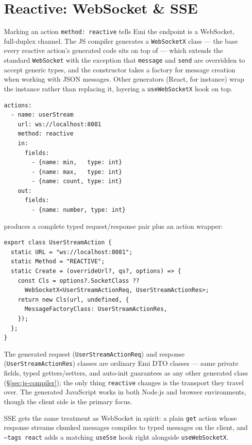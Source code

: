 \section{Reactive: WebSocket \& SSE}
\label{sec:reactive}

Marking an action \texttt{method: reactive} tells Emi the endpoint is a
WebSocket, full-duplex channel. The JS compiler generates a
\texttt{WebSocketX} class --- the base every reactive action's generated
code sits on top of --- which extends the standard \texttt{WebSocket}
with the exception that \texttt{message} and \texttt{send} are overridden
to accept generic types, and the constructor takes a factory for message
creation when working with JSON messages. Other generators (React, for
instance) wrap the instance rather than replacing it, layering a
\texttt{useWebSocketX} hook on top.

\begin{lstlisting}
actions:
  - name: userStream
    url: ws://localhost:8081
    method: reactive
    in:
      fields:
        - {name: min,   type: int}
        - {name: max,   type: int}
        - {name: count, type: int}
    out:
      fields:
        - {name: number, type: int}
\end{lstlisting}

produces a complete typed request/response pair plus an action wrapper:

\begin{lstlisting}
export class UserStreamAction {
  static URL = "ws://localhost:8081";
  static Method = "REACTIVE";
  static Create = (overrideUrl?, qs?, options) => {
    const Cls = options?.SocketClass ??
      WebSocketX<UserStreamActionReq, UserStreamActionRes>;
    return new Cls(url, undefined, {
      MessageFactoryClass: UserStreamActionRes,
    });
  };
}
\end{lstlisting}

The generated request (\texttt{UserStreamActionReq}) and response
(\texttt{UserStreamActionRes}) classes are ordinary Emi DTO classes ---
same private fields, typed getters/setters, and auto-init guarantees as
any other generated class (\S\ref{sec:js-compiler}); the only thing
\texttt{reactive} changes is the transport they travel over. The
generated JavaScript works in both Node.js and browser environments,
though the client side is the primary focus.

\begin{pullquote}
SSE gets the same treatment as WebSocket in spirit: a plain \texttt{get}
action whose response streams chunked messages compiles to typed
messages on the client, and \texttt{--tags react} adds a matching
\texttt{useSse} hook right alongside \texttt{useWebSocketX}.
\end{pullquote}
